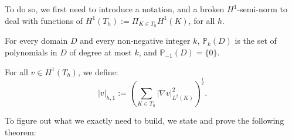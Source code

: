 \noindent To do so, we first need to introduce a notation, and a broken $H^1$-semi-norm to deal with functions of $H^1(T_h) := \Pi_{K\in T_h}H^1(K)$, for all $h$. 
\begin{notation}
For every domain $D$ and every non-negative integer $k$, $\mathbb{P}_k(D)$ is the set of polynomials in $D$ of degree at most $k$, and $\mathbb{P}_{-1}(D)=\{0\}$.
\end{notation}
\begin{definition}
For all $v\in H^1(T_h)$, we define:
$$ |v|_{h,1} := \left( \sum_{K\in T_h} |\nabla v|^2_{L^2(K)} \right)^{\frac{1}{2}}.$$
\end{definition}

\noindent To figure out what we exactly need to build, we state and prove the following theorem: 


